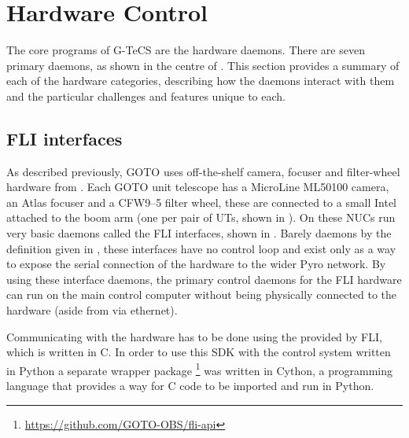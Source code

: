 
\newpage
\section{Hardware Control}
\label{sec:hardware_control}
\begin{colsection}


\begin{colsection}

The core programs of G-TeCS are the hardware daemons. There are seven primary daemons, as shown in the centre of . This section provides a summary of each of the hardware categories, describing how the daemons interact with them and the particular challenges and features unique to each.

\end{colsection}


\subsection{FLI interfaces}
\label{sec:fli}
\begin{colsection}

As described previously, GOTO uses off-the-shelf camera, focuser and filter-wheel hardware from . Each GOTO unit telescope has a MicroLine ML50100 camera, an Atlas focuser and a CFW9--5 filter wheel, these are connected to a small Intel  attached to the boom arm (one per pair of UTs, shown in ). On these NUCs run very basic daemons called the FLI interfaces, shown in . Barely daemons by the definition given in , these interfaces have no control loop and exist only as a way to expose the serial connection of the hardware to the wider Pyro network. By using these interface daemons, the primary control daemons for the FLI hardware can run on the main control computer without being physically connected to the hardware (aside from via ethernet).

Communicating with the hardware has to be done using the  provided by FLI, which is written in C. In order to use this SDK with the control system written in Python a separate wrapper package \footnote{\url{https://github.com/GOTO-OBS/fli-api}} was written in Cython, a programming language that provides a way for C code to be imported and run in Python.


\end{colsection}
\end{colsection}
